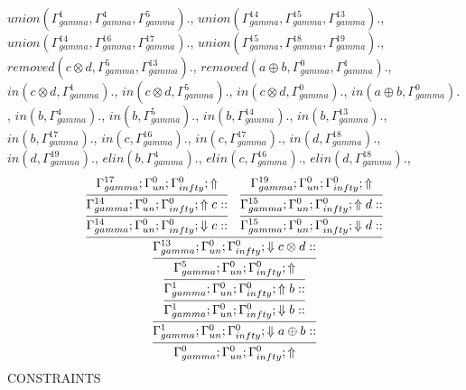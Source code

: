 \documentclass[a4paper, 11pt]{article}
\begin{document}
$union(\Gamma_{gamma}^{1}, \Gamma_{gamma}^{4}, \Gamma_{gamma}^{5}).$, $union(\Gamma_{gamma}^{14}, \Gamma_{gamma}^{15}, \Gamma_{gamma}^{13}).$, $union(\Gamma_{gamma}^{14}, \Gamma_{gamma}^{16}, \Gamma_{gamma}^{17}).$, $union(\Gamma_{gamma}^{15}, \Gamma_{gamma}^{18}, \Gamma_{gamma}^{19}).$, $removed(c \otimes d, \Gamma_{gamma}^{5}, \Gamma_{gamma}^{13}).$, $removed(a \oplus b, \Gamma_{gamma}^{0}, \Gamma_{gamma}^{1}).$, $in(c \otimes d, \Gamma_{gamma}^{1}).$, $in(c \otimes d, \Gamma_{gamma}^{5}).$, $in(c \otimes d, \Gamma_{gamma}^{0}).$, $in(a \oplus b, \Gamma_{gamma}^{0}).$, $in(b, \Gamma_{gamma}^{4}).$, $in(b, \Gamma_{gamma}^{5}).$, $in(b, \Gamma_{gamma}^{14}).$, $in(b, \Gamma_{gamma}^{13}).$, $in(b, \Gamma_{gamma}^{17}).$, $in(c, \Gamma_{gamma}^{16}).$, $in(c, \Gamma_{gamma}^{17}).$, $in(d, \Gamma_{gamma}^{18}).$, $in(d, \Gamma_{gamma}^{19}).$, $elin(b, \Gamma_{gamma}^{4}).$, $elin(c, \Gamma_{gamma}^{16}).$, $elin(d, \Gamma_{gamma}^{18}).$, 
{\small
\[
\infer{\Gamma_{ gamma}^{0} ; \Gamma_{un}^{0} ; \Gamma_{ infty}^{0} ;  \Uparrow }
{\infer{\Gamma_{ gamma}^{1} ; \Gamma_{un}^{0} ; \Gamma_{ infty}^{0} ;  \Downarrow a \oplus b :: }
{\infer{\Gamma_{ gamma}^{1} ; \Gamma_{un}^{0} ; \Gamma_{ infty}^{0} ;  \Downarrow b :: }
{\infer{\Gamma_{ gamma}^{1} ; \Gamma_{un}^{0} ; \Gamma_{ infty}^{0} ;  \Uparrow b :: }
{\infer{\Gamma_{ gamma}^{5} ; \Gamma_{un}^{0} ; \Gamma_{ infty}^{0} ;  \Uparrow }
{\infer{\Gamma_{ gamma}^{13} ; \Gamma_{un}^{0} ; \Gamma_{ infty}^{0} ;  \Downarrow c \otimes d :: }
{\infer{\Gamma_{ gamma}^{14} ; \Gamma_{un}^{0} ; \Gamma_{ infty}^{0} ;  \Downarrow c :: }
{\infer{\Gamma_{ gamma}^{14} ; \Gamma_{un}^{0} ; \Gamma_{ infty}^{0} ;  \Uparrow c :: }
{\Gamma_{ gamma}^{17} ; \Gamma_{un}^{0} ; \Gamma_{ infty}^{0} ;  \Uparrow }}
&
\infer{\Gamma_{ gamma}^{15} ; \Gamma_{un}^{0} ; \Gamma_{ infty}^{0} ;  \Downarrow d :: }
{\infer{\Gamma_{ gamma}^{15} ; \Gamma_{un}^{0} ; \Gamma_{ infty}^{0} ;  \Uparrow d :: }
{\Gamma_{ gamma}^{19} ; \Gamma_{un}^{0} ; \Gamma_{ infty}^{0} ;  \Uparrow }}}}}}}}
\]
}
CONSTRAINTS
\end{document}
